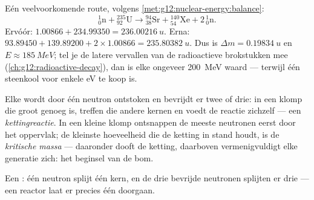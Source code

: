 \begin{example}\label{ex:g12:nuclear-energy:fissionbalance}
Eén veelvoorkomende route, volgens \cref{met:g12:nuclear-energy:balance}:
\[
{}^{1}_{0}\mathrm{n} + {}^{235}_{92}\mathrm{U} \longrightarrow
{}^{94}_{38}\mathrm{Sr} + {}^{140}_{54}\mathrm{Xe} + 2\,{}^{1}_{0}\mathrm{n}.
\]
Ervóór: $1.00866 + 234.99350 = \qty{236.00216}{u}$. Erna:
$93.89450 + 139.89200 + 2 \times 1.00866 = \qty{235.80382}{u}$. Dus is
$\Delta m = \qty{0.19834}{u}$ en $E \approx \qty{185}{MeV}$; tel je de latere
vervallen van de radioactieve brokstukken mee
(\cref{ch:g12:radioactive-decay}), dan is elke  ongeveer
\qty{200}{MeV} waard --- terwijl één  steenkool voor enkele \unit{eV} te
koop is.
\end{example}

\begin{definition}\label{def:g12:nuclear-energy:chain}
Elke  wordt door één neutron ontstoken en bevrijdt er twee of
drie: in een klomp die groot genoeg is, treffen die andere kernen en voedt de
reactie zichzelf --- een \emph{kettingreactie}. In een
kleine klomp ontsnappen de meeste neutronen eerst door het oppervlak; de
kleinste hoeveelheid die de ketting in stand houdt, is de \emph{kritische
massa} --- daaronder dooft de ketting, daarboven
vermenigvuldigt elke generatie zich: het beginsel van de bom.
\end{definition}

\begin{omfigure}

{\small Een : één neutron splijt één kern, en de drie bevrijde
neutronen splijten er drie --- een reactor laat er precies één doorgaan.}
\end{omfigure}

